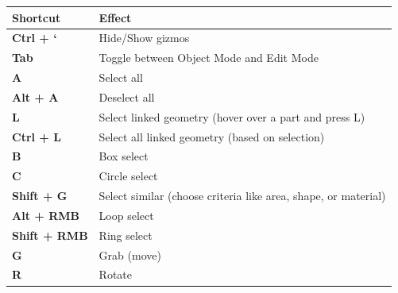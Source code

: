 \documentclass{article}
\begin{document}
\begin{longtable}{ll}
    \toprule
    \textbf{Shortcut}                                         & \textbf{Effect}                                                    \\
    \midrule
    \endhead
    \bottomrule
    \endfoot

    \textbf{Ctrl + `}                                         & Hide/Show gizmos                                                   \\
    \textbf{Tab}                                              & Toggle between Object Mode and Edit Mode                           \\
    \textbf{A}                                                & Select all                                                         \\
    \textbf{Alt + A}                                          & Deselect all                                                       \\
    \textbf{L}                                                & Select linked geometry (hover over a part and press L)             \\
    \textbf{Ctrl + L}                                         & Select all linked geometry (based on selection)                    \\
    \textbf{B}                                                & Box select                                                         \\
    \textbf{C}                                                & Circle select                                                      \\
    \textbf{Shift + G}                                        & Select similar (choose criteria like area, shape, or material)     \\
    \textbf{Alt + RMB}                                        & Loop select                                                        \\
    \textbf{Shift + RMB}                                      & Ring select                                                        \\
    \midrule
    \textbf{G}                                                & Grab (move)                                                        \\
    \textbf{R}                                                & Rotate                                                             \\

\end{longtable}
\end{document}
